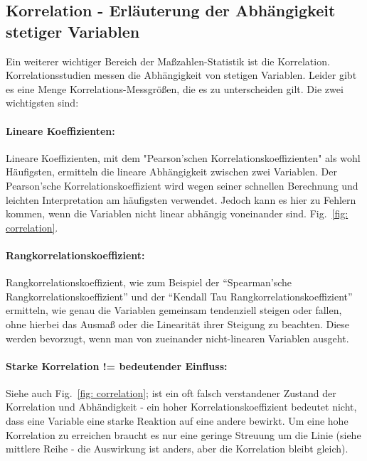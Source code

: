 \documentclass[a4paper,twoside]{tufte-book}\usepackage[]{graphicx}\usepackage[]{color}
\begin{document}
\subsection{Korrelation - Erläuterung der Abhängigkeit stetiger Variablen}

Ein weiterer wichtiger Bereich der Maßzahlen-Statistik ist die Korrelation. Korrelationsstudien messen die Abhängigkeit von stetigen Variablen. Leider gibt es eine Menge Korrelations-Messgrößen, die es zu unterscheiden gilt. Die zwei wichtigsten sind:

\paragraph{Lineare Koeffizienten:}Lineare Koeffizienten, mit dem "Pearson'schen Korrelationskoeffizienten" als wohl Häufigsten, ermitteln die lineare Abhängigkeit zwischen zwei Variablen. Der Pearson'sche Korrelationskoeffizient wird wegen seiner schnellen Berechnung und leichten Interpretation am häufigsten verwendet. Jedoch kann es hier zu Fehlern kommen, wenn die Variablen nicht linear abhängig voneinander sind. Fig.~\ref{fig: correlation}.

\paragraph{Rangkorrelationskoeffizient:} Rangkorrelationskoeffizient, wie zum Beispiel der ``Spearman'sche Rangkorrelationskoeffizient'' und der ``Kendall Tau Rangkorrelationskoeffizient'' ermitteln, wie genau die Variablen gemeinsam tendenziell steigen oder fallen, ohne hierbei das Ausmaß oder die Linearität ihrer Steigung zu beachten. Diese werden bevorzugt, wenn man von zueinander nicht-linearen Variablen ausgeht. 

\paragraph{Starke Korrelation != bedeutender Einfluss:} Siehe auch Fig.~\ref{fig: correlation}; ist ein oft falsch verstandener Zustand der Korrelation und Abhändigkeit - ein hoher Korrelationskoeffizient bedeutet nicht, dass eine Variable eine starke Reaktion auf eine andere bewirkt. Um eine hohe Korrelation zu erreichen braucht es nur eine geringe Streuung um die Linie (siehe mittlere Reihe - die Auswirkung ist anders, aber die Korrelation bleibt gleich). 
\end{document}
